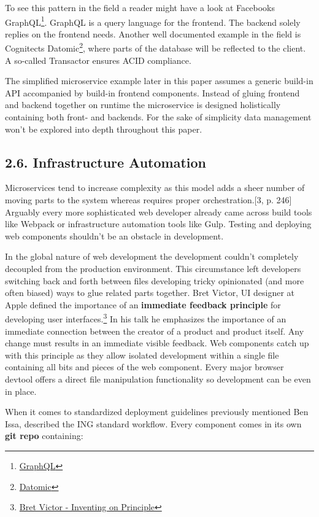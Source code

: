 \documentclass[]{article}
\begin{document}
To see this pattern in the field a reader might have a look at Facebooks
GraphQL\footnote{\href{http://graphql.org/}{GraphQL}}. GraphQL is a
query language for the frontend. The backend solely replies on the
frontend needs. Another well documented example in the field is
Cognitects Datomic\footnote{\href{http://www.datomic.com/}{Datomic}},
where parts of the database will be reflected to the client. A so-called
Transactor ensures ACID compliance.

The simplified microservice example later in this paper assumes a
generic build-in API accompanied by build-in frontend components.
Instead of gluing frontend and backend together on runtime the
microservice is designed holistically containing both front- and
backends. For the sake of simplicity data management won't be explored
into depth throughout this paper.

\subsection{2.6. Infrastructure
Automation}\label{infrastructure-automation}

Microservices tend to increase complexity as this model adds a sheer
number of moving parts to the system whereas requires proper
orchestration.{[}3, p. 246{]} Arguably every more sophisticated web
developer already came across build tools like Webpack or infrastructure
automation tools like Gulp. Testing and deploying web components
shouldn't be an obstacle in development.

In the global nature of web development the development couldn't
completely decoupled from the production environment. This circumstance
left developers switching back and forth between files developing tricky
opinionated (and more often biased) ways to glue related parts together.
Bret Victor, UI designer at Apple defined the importance of an
\textbf{immediate feedback principle} for developing user
interfaces.\footnote{\href{https://vimeo.com/36579366}{Bret Victor -
  Inventing on Principle}} In his talk he emphasizes the importance of
an immediate connection between the creator of a product and product
itself. Any change must results in an immediate visible feedback. Web
components catch up with this principle as they allow isolated
development within a single file containing all bits and pieces of the
web component. Every major browser devtool offers a direct file
manipulation functionality so development can be even in place.

When it comes to standardized deployment guidelines previously mentioned
Ben Issa, described the ING standard workflow. Every component comes in
its own \textbf{git repo} containing:
\end{document}
